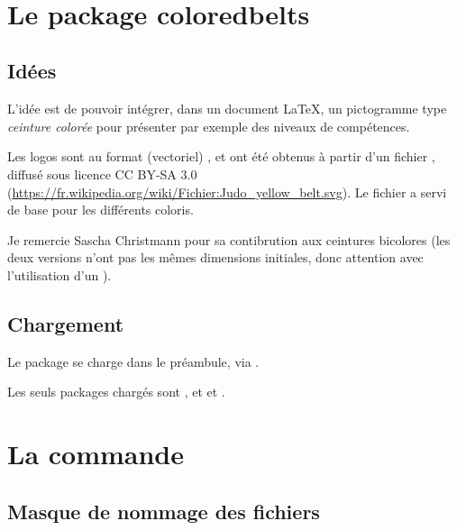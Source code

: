 \documentclass[french,11pt,a4paper]{article}
\begin{document}
\vfill~

\pagebreak

\section{Le package coloredbelts}

\subsection{Idées}

L'idée est de pouvoir intégrer, dans un document \LaTeX, un pictogramme type \textit{ceinture colorée} pour présenter par exemple des niveaux de compétences.

\medskip

Les logos sont au format (vectoriel) , et ont été obtenus à partir d'un fichier , diffusé sous licence CC BY-SA 3.0 (\url{https://fr.wikipedia.org/wiki/Fichier:Judo_yellow_belt.svg}). Le fichier a servi de base pour les différents coloris.

\medskip

Je remercie Sascha Christmann pour sa contibrution aux ceintures bicolores (les deux versions n'ont pas les mêmes dimensions initiales, donc attention avec l'utilisation d'un ).

\subsection{Chargement}

Le package se charge dans le préambule, via .

Les seuls packages chargés sont ,  et  et .

\begin{codehigh}[language=latex/latex2,style/main=cyan!10,style/code=cyan!10]
\usepackage{coloredbelts}
\end{codehigh}

\section{La commande}

\subsection{Masque de nommage des fichiers}
\end{document}
